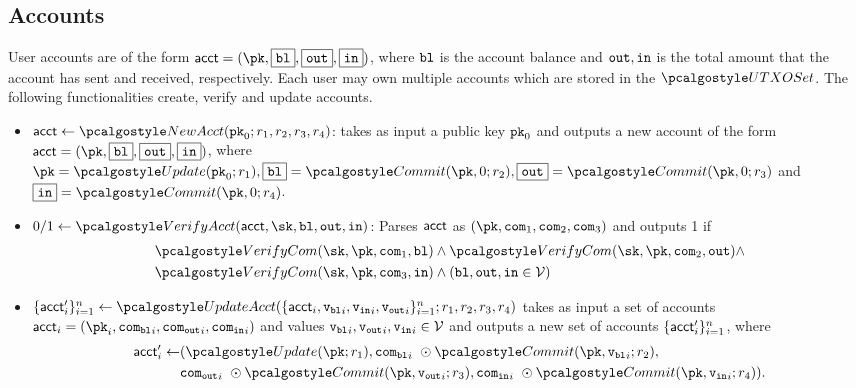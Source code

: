 \subsection{Accounts}
User accounts are of the form $\acct = (\pk,\comm{\varbl}, \comm{\varout}, \comm{\varin})$, where $\textup{\texttt{{bl}}}$ is the account balance and $\textup{\texttt{{out}}}, \textup{\texttt{{in}}}$ is the total amount that the account has sent and received, respectively.
Each user may own multiple accounts which are stored in the $\utxoset$. 
The following functionalities create, verify and update accounts.

\begin{itemize}
    \item $\acct \gets \newacc(\inpk; r_1, r_2, r_3, r_4)$: takes as input a public key $\textup{\texttt{pk}}_{0}$ and outputs a new account of the form $\acct = (\pk, \comm{\varbl}, \comm{\varout}, \comm{\varin})$, where $ \pk = \upd(\inpk; r_1), \comm{\varbl} = \commit(\pk, 0;r_2),  \comm{\varout} = \commit(\pk, 0;r_3)$ and $\comm{\varin} = \commit(\pk, 0;r_4)$.

    \item $0/1 \gets \veract(\acct,\sk,\varbl,\varout,\varin)$: Parses $\textup{\textsf{acct}}$  as $(\pk, \com_1, \com_2, \com_3)$ and outputs 1 if
    \begin{align*}
        & \vercom(\sk, \pk, \com_1, \varbl) \land \vercom(\sk, \pk, \com_2, \varout) \land \\
        & \vercom(\sk, \pk, \com_3, \varin) \land (\varbl, \varout, \varin \in \vset)
    \end{align*}

    \item $\{\acct'_i\}_{i=1}^n \gets \updacc(\{ \acct_i, {\vbl}_i, {\vin}_i, {\vout}_i \}_{i=1}^n; r_1,r_2,r_3,r_4)$ takes as input a set of accounts $\acct_i = (\pk_i, {\com_{\varbl}}_i, {\com_{\varout}}_i, {\com_{\varin}}_i)$ and values
    ${\textup{\texttt{{v}}}_{\textup{\texttt{{bl}}}}}_i, {\textup{\texttt{{v}}}_{\textup{\texttt{{out}}}}}_i, {\textup{\texttt{{v}}}_{\textup{\texttt{{in}}}}}_i \in \mathcal{V}$ and outputs a new set of accounts  $\{\textup{\textsf{acct}}'_i\}_{i=1}^n$,
    where 
    \begin{align*}
        \acct'_i \gets  &(\upd (\pk;r_1), {\com_{\varbl}}_i \ \odot \commit(\pk, {\vbl}_i;r_2), \\
                        & {\com_{\varout}}_i \ \odot  \commit(\pk,{\vout}_i;r_3 ), {\com_{\varin}}_i \ \odot  \commit(\pk, {\vin}_i;r_4)).
    \end{align*}


\end{itemize}
